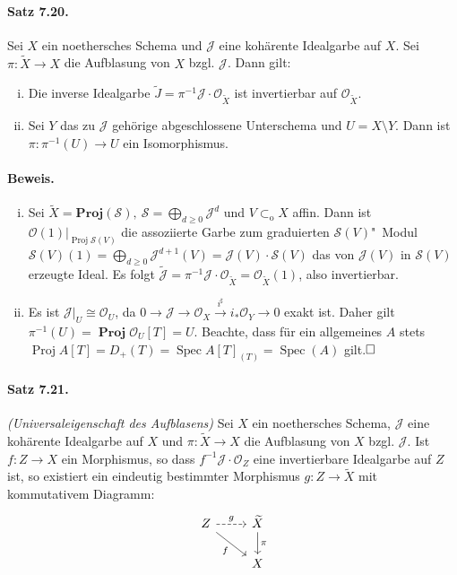 \documentclass[11pt,b5paper,openany]{memoir}
\def \qed {$\hfill\square$}
\begin{document}
\paragraph{Satz 7.20.}\label{7.20} Sei $X$ ein noethersches Schema und $\mathcal{J}$ eine kohärente Idealgarbe auf $X$. Sei $\pi:\widetilde{X}\to X$ die Aufblasung von $X$ bzgl. $\mathcal{J}$. Dann gilt:
\begin{enumerate}[(i)]
\item Die inverse Idealgarbe $\widetilde{J}=\pi^{-1}\mathcal{J}\cdot\mathcal{O}_{\widetilde{X}}$ ist invertierbar auf $\mathcal{O}_{\widetilde{X}}$.
\item Sei $Y$ das zu $\mathcal{J}$ gehörige abgeschlossene Unterschema und $U=X\setminus Y$. Dann ist $\pi:\pi^{-1}(U)\to U$ ein Isomorphismus.
\end{enumerate}

\paragraph{Beweis.}\begin{enumerate}[(i)]
\item Sei $\widetilde{X}=\mathbf{Proj}(\mathcal{S}),\ \mathcal{S}=\bigoplus_{d\geq 0}\mathcal{J}^d$ und $V\subset_\text{o}X$ affin. Dann ist $\mathcal{O}(1)|_{\operatorname{Proj}\mathcal{S}(V)}$ die assoziierte Garbe zum graduierten $\mathcal{S}(V)$"~Modul $\mathcal{S}(V)(1)=\bigoplus_{d\geq 0}\mathcal{J}^{d+1}(V)=\mathcal{J}(V)\cdot \mathcal{S}(V)$ das von $\mathcal{J}(V)$ in $\mathcal{S}(V)$ erzeugte Ideal. Es folgt $\widetilde{\mathcal{J}}=\pi^{-1}\mathcal{J}\cdot\mathcal{O}_{\widetilde{X}}=\mathcal{O}_{\widetilde{X}}(1)$, also invertierbar.
\item Es ist $\mathcal{J}|_U\cong\mathcal{O}_U$, da $0\to\mathcal{J}\to\mathcal{O}_X\stackrel{i^\sharp}{\to }i_\ast\mathcal{O}_Y\to 0$ exakt ist. Daher gilt $\pi^{-1}(U)=\operatorname{\mathbf{Proj}}\mathcal{O}_U[T]=U$. Beachte, dass für ein allgemeines $A$ stets $\operatorname{Proj}A[T]=D_+(T)=\operatorname{Spec}A[T]_{(T)}=\operatorname{Spec}(A)$ gilt.\qed
\end{enumerate}

\paragraph{Satz 7.21.}\label{7.21} \textit{(Universaleigenschaft des Aufblasens)} Sei $X$ ein noethersches Schema, $\mathcal{J}$ eine kohärente Idealgarbe auf $X$ und $\pi:\widetilde{X}\to X$ die Aufblasung von $X$ bzgl. $\mathcal{J}$. Ist $f:Z\to X$ ein Morphismus, so dass $f^{-1}\mathcal{J}\cdot\mathcal{O}_Z$ eine invertierbare Idealgarbe auf $Z$ ist, so existiert ein eindeutig bestimmter Morphismus $g:Z\to\widetilde{X}$ mit kommutativem Diagramm:
\[\begin{tikzcd}
Z\rar["g", dashed]\ar[rd, "f"'] & \widetilde{X}\dar["\pi"]\\
& X
\end{tikzcd} \]
\end{document}
